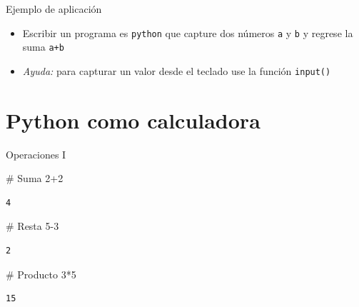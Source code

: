 \documentclass[
  ignorenonframetext,
  aspectratio=169,
  spanish,
]{beamer}
\newenvironment{Shaded}{\begin{snugshade}}{\end{snugshade}}
\newcommand{\CommentTok}[1]{\textcolor[rgb]{0.37,0.37,0.37}{#1}}
\newcommand{\DecValTok}[1]{\textcolor[rgb]{0.68,0.00,0.00}{#1}}
\newcommand{\OperatorTok}[1]{\textcolor[rgb]{0.37,0.37,0.37}{#1}}
\begin{document}
\begin{frame}[fragile]{Ejemplo de aplicación}
\label{ejemplo-de-aplicaciuxf3n}
\begin{itemize}
\item
  Escribir un programa es \texttt{python} que capture dos números
  \texttt{a} y \texttt{b} y regrese la suma \texttt{a+b}
\item
  \emph{Ayuda:} para capturar un valor desde el teclado use la función
  \texttt{input()}
\end{itemize}
\end{frame}

\section{Python como calculadora}\label{python-como-calculadora}

\begin{frame}[fragile]{Operaciones I}
\label{operaciones-i}
\begin{Shaded}
\begin{Highlighting}[]
\CommentTok{\# Suma }
\DecValTok{2}\OperatorTok{+}\DecValTok{2}
\end{Highlighting}
\end{Shaded}

\begin{verbatim}
4
\end{verbatim}

\begin{Shaded}
\begin{Highlighting}[]
\CommentTok{\# Resta }
\DecValTok{5}\OperatorTok{{-}}\DecValTok{3} 
\end{Highlighting}
\end{Shaded}

\begin{verbatim}
2
\end{verbatim}

\begin{Shaded}
\begin{Highlighting}[]
\CommentTok{\# Producto }
\DecValTok{3}\OperatorTok{*}\DecValTok{5} 
\end{Highlighting}
\end{Shaded}

\begin{verbatim}
15
\end{verbatim}
\end{frame}
\end{document}
